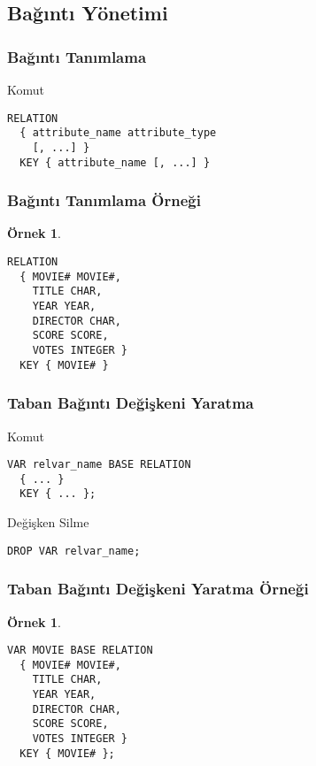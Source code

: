 \documentclass[dvipsnames]{beamer}
\theoremstyle{definition}
\theoremstyle{example}
\newtheorem{ornek}[theorem]{Örnek}
\theoremstyle{plain}
\begin{document}
\subsection{Bağıntı Yönetimi}

\begin{frame}[fragile]
  \frametitle{Bağıntı Tanımlama}

  \begin{block}{Komut}
    \begin{lstlisting}
RELATION
  { attribute_name attribute_type
    [, ...] }
  KEY { attribute_name [, ...] }
    \end{lstlisting}
  \end{block}
\end{frame}

\begin{frame}[fragile]
  \frametitle{Bağıntı Tanımlama Örneği}

  \begin{ornek}
    \begin{lstlisting}
RELATION
  { MOVIE# MOVIE#,
    TITLE CHAR,
    YEAR YEAR,
    DIRECTOR CHAR,
    SCORE SCORE,
    VOTES INTEGER }
  KEY { MOVIE# }
    \end{lstlisting}
  \end{ornek}
\end{frame}

\begin{frame}[fragile]
  \frametitle{Taban Bağıntı Değişkeni Yaratma}

  \begin{block}{Komut}
    \begin{lstlisting}
VAR relvar_name BASE RELATION
  { ... }
  KEY { ... };
    \end{lstlisting}
  \end{block}

  \pause
  \begin{block}{Değişken Silme}
    \begin{lstlisting}
DROP VAR relvar_name;
    \end{lstlisting}
  \end{block}
\end{frame}

\begin{frame}[fragile]
  \frametitle{Taban Bağıntı Değişkeni Yaratma Örneği}

  \begin{ornek}
    \begin{lstlisting}
VAR MOVIE BASE RELATION
  { MOVIE# MOVIE#,
    TITLE CHAR,
    YEAR YEAR,
    DIRECTOR CHAR,
    SCORE SCORE,
    VOTES INTEGER }
  KEY { MOVIE# };
    \end{lstlisting}
  \end{ornek}
\end{frame}
\end{document}

